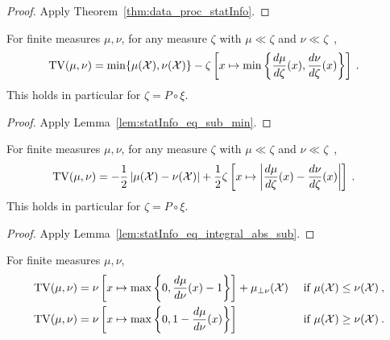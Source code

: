 \begin{proof}%
{}
Apply Theorem~\ref{thm:data_proc_statInfo}.
\end{proof}


\begin{lemma}
  \label{lem:tv_eq_sub_min}
  For finite measures $\mu, \nu$, for any measure $\zeta$ with $\mu \ll \zeta$ and $\nu \ll \zeta$~,
  \begin{align*}
  \operatorname{TV}(\mu, \nu)
  &= \min\{\mu(\mathcal X), \nu(\mathcal X)\} - \zeta\left[x \mapsto \min \left\{\frac{d \mu}{d\zeta}(x), \frac{d \nu}{d\zeta}(x)\right\}\right]
  \: .
  \end{align*}
  This holds in particular for $\zeta = P \circ \xi$.
\end{lemma}

\begin{proof}%
{}
Apply Lemma~\ref{lem:statInfo_eq_sub_min}.
\end{proof}


\begin{lemma}
  \label{lem:tv_eq_integral_abs_sub}
  For finite measures $\mu, \nu$, for any measure $\zeta$ with $\mu \ll \zeta$ and $\nu \ll \zeta$~,
  \begin{align*}
  \operatorname{TV}(\mu, \nu)
  &= - \frac{1}{2} \left\vert \mu(\mathcal X) - \nu(\mathcal X) \right\vert + 
  \frac{1}{2} \zeta\left[x \mapsto \left\vert \frac{d \mu}{d\zeta}(x) - \frac{d \nu}{d\zeta}(x)\right\vert\right] 
  \: .
  \end{align*}
  This holds in particular for $\zeta = P \circ \xi$.
\end{lemma}

\begin{proof}%
{}
Apply Lemma~\ref{lem:statInfo_eq_integral_abs_sub}.
\end{proof}


\begin{lemma}
  \label{lem:tv_eq_integral}
  For finite measures $\mu, \nu$,
  \begin{align*}
  \operatorname{TV}(\mu, \nu)
  &= \nu\left[ x \mapsto \max \left\{0 , \frac{d \mu}{d\nu}(x) - 1 \right\} \right] + \mu_{\perp \nu}(\mathcal X) & \text{ if } \mu(\mathcal X) \le \nu(\mathcal X)
  \: , \\
  \operatorname{TV}(\mu, \nu)
  &= \nu\left[ x \mapsto \max \left\{0 , 1 - \frac{d \mu}{d\nu}(x) \right\} \right] & \text{ if } \mu(\mathcal X) \ge \nu(\mathcal X)
  \: .
  \end{align*}
\end{lemma}

